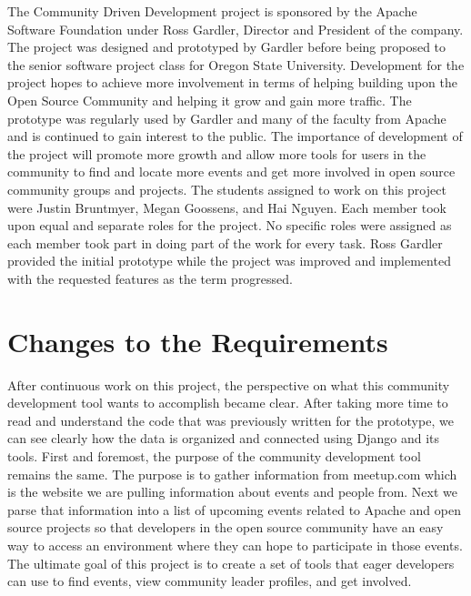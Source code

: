 \documentclass[draftclsnofoot,10pt,onecolumn]{IEEEtran} %
\begin{document}
The Community Driven Development project is sponsored by the Apache Software Foundation under Ross Gardler, Director and President of the company. The project was designed and prototyped by Gardler before being proposed to the senior software project class for Oregon State University. Development for the project hopes to achieve more involvement in terms of helping building upon the Open Source Community and helping it grow and gain more traffic. The prototype was regularly used by Gardler and many of the faculty from Apache and is continued to gain interest to the public. The importance of development of the project will promote more growth and allow more tools for users in the community to find and locate more events and get more involved in open source community groups and projects. The students assigned to work on this project were Justin Bruntmyer, Megan Goossens, and Hai Nguyen. Each member took upon equal and separate roles for the project. No specific roles were assigned as each member took part in doing part of the work for every task. Ross Gardler provided the initial prototype while the project was improved and implemented with the requested features as the term progressed.





\section{Changes to the Requirements}
After continuous work on this project, the perspective on what
this community development tool wants to accomplish became clear. After taking
more time to read and understand the code that was previously written for the
prototype, we can see clearly how the data is organized and connected
using Django and its tools. First and foremost, the purpose of the community
development tool remains the same. The purpose is to gather information from
meetup.com which is the website we are pulling information about events and people from.
Next we parse that information into a list of upcoming events related to
Apache and open source projects so that developers in the open source community
have an easy way to access an environment where they can hope to participate in those
events. The ultimate goal of this project is to create a set of tools that eager developers
can use to find events, view community leader profiles, and get involved.\\
\end{document}
